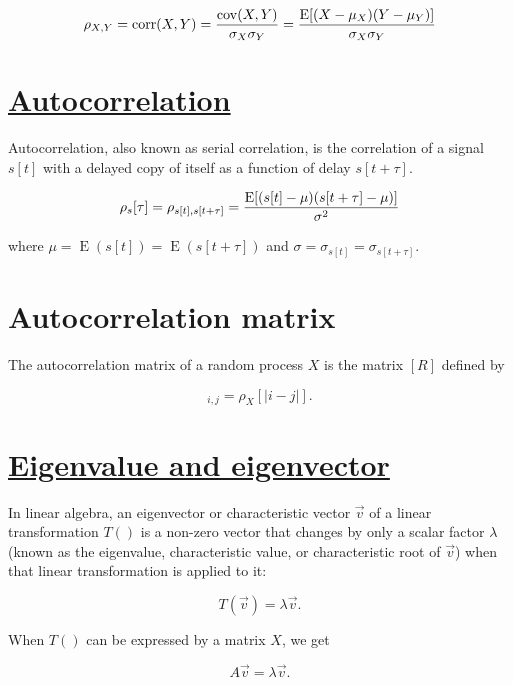 \begin{equation}
  \rho_{X,Y}=\mathrm{corr}(X,Y)={\mathrm{cov}(X,Y) \over \sigma_X \sigma_Y} ={\operatorname{E}[(X-\mu_X)(Y-\mu_Y)] \over \sigma_X\sigma_Y}
\end{equation}

\section{\href{https://en.wikipedia.org/wiki/Autocorrelation}{Autocorrelation}}
Autocorrelation, also known as serial correlation, is the correlation of
a signal \(s[t]\) with a delayed copy of itself as a function of delay
\(s[t+\tau]\).

\begin{equation}
  \rho_s[\tau]=\rho_{s[t],s[t+\tau]}={\operatorname{E}[(s[t]-\mu)(s[t+\tau]-\mu)] \over \sigma^2}
\end{equation}

where \(\mu=\operatorname{E}(s[t])=\operatorname{E}(s[t+\tau])\) and
\(\sigma=\sigma_{s[t]}=\sigma_{s[t+\tau]}\).

\section{Autocorrelation matrix}
The autocorrelation matrix of a random process \(X\) is the matrix
\([R]\) defined by

\begin{equation}
  [R]_{i,j} = \rho_X[|i-j|].
\end{equation}

\section{\href{https://en.wikipedia.org/wiki/Eigenvalues_and_eigenvectors}{Eigenvalue and eigenvector}}
In linear algebra, an eigenvector or characteristic vector
\(\overrightarrow{v}\) of a linear transformation \(T()\) is a non-zero
vector that changes by only a scalar factor \(\lambda\) (known as the
eigenvalue, characteristic value, or characteristic root of
\(\overrightarrow{v}\)) when that linear transformation is applied to
it:

\begin{equation}
  {\displaystyle T(\overrightarrow{v} )=\lambda \overrightarrow{v}}.
\end{equation}

When \(T()\) can be expressed by a matrix \(X\), we get

\begin{equation}
  A\overrightarrow{v} =\lambda \overrightarrow{v}.
\end{equation}

